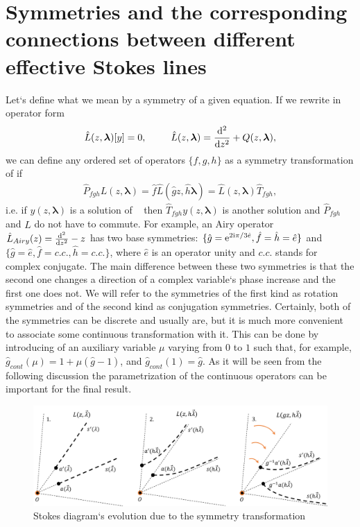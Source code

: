 \documentclass[12pt]{iopart}
\def\f{\hat{f}}
\def\g{\hat{g}}
\def\h{\hat{h}}
\def\L{\hat{L}}
\def\lmbd{\bm{\lambda}}
\begin{document}
\section{Symmetries and the corresponding connections between different effective Stokes lines 
\label{sec:smmtrs}}
Let`s define what we mean by a symmetry of a given equation. If we rewrite  in operator form
\begin{eqnarray}
\L(z,\lmbd)[y]=0, \qquad \L(z,\lmbd)=\frac{\rmd^2}{\rmd z^2} + Q(z,\lmbd),   \label{eq:L}
\end{eqnarray}
we can define any ordered set of operators $\{f,g,h\}$ as a symmetry transformation of  if
\begin{eqnarray}
\hat{P}_{fgh}L(z,\lmbd)=\f\L(\g z,\h\lmbd)=\L(z,\lmbd)\hat{T}_{fgh},   \label{eq:symdef}
\end{eqnarray}
i.e. if $y(z,\lmbd)$ is a solution of ~ then $\hat{T}_{fgh}y(z,\lmbd)$ is another solution and $\hat{P}_{fgh}$ and $\L$ do not have to commute. 
For example, an Airy operator $\L_{Airy}(z) = \frac{\rmd^2}{\rmd z^2} - z$ has two base symmetries: 
$\{\g=\rme^{2 \rmi \pi/3 \hat{e}},\f=\h=\hat{e}\}$ 
and $\{\g=\hat{e},\f=c.c.,\h=c.c.\}$, where $\hat{e}$ is an operator unity and $c.c.$ stands for complex conjugate. The main difference between these two symmetries is that the second one changes a direction of a complex variable`s phase increase and the first one does not. We will refer to the symmetries of the first kind as rotation symmetries and of the second kind as conjugation symmetries. Certainly, both of the symmetries can be discrete and usually are, but it is much more convenient to associate some continuous transformation with it. This can be done by introducing of an auxiliary variable $\mu$ varying from $0$ to $1$ such that, for example, $\g_{cont}(\mu)=1+\mu (\g-1)$, and $\g_{cont}(1)=\g$. As it will be seen from the following discussion the parametrization of the continuous operators can be important for the final result.

\begin{figure}
\centering
\noindent
\includegraphics[scale=.5]{stuff/rs.png}
\caption{Stokes diagram`s evolution due to the symmetry transformation}
\label{fig:rst}
\end{figure} 
\end{document}
